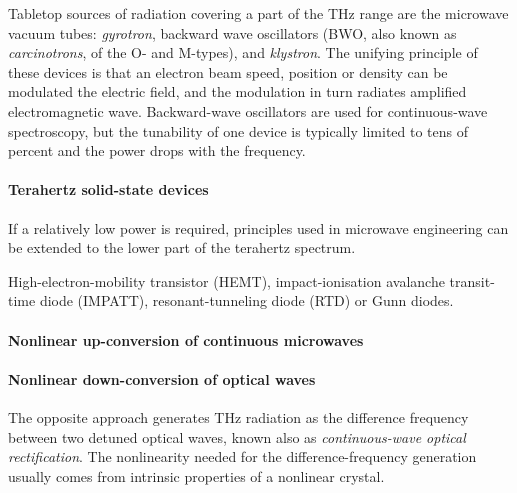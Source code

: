 Tabletop sources of radiation covering a part of the THz range are the microwave vacuum tubes: \textit{gyrotron}, backward wave oscillators (BWO, also known as \textit{carcinotrons}, of the O- and M-types), and \textit{klystron}. The unifying principle of these devices is that an electron beam speed, position or density can be modulated the electric field, and the modulation in turn radiates amplified electromagnetic wave. Backward-wave oscillators are used for continuous-wave spectroscopy, but the tunability of one device is typically limited to tens of percent and the power drops with the frequency.

\paragraph{Terahertz solid-state devices}
If a relatively low power is required, principles used in microwave engineering can be extended to the lower part of the terahertz spectrum. 

High-electron-mobility transistor (HEMT), impact-ionisation avalanche transit-time diode (IMPATT), resonant-tunneling diode (RTD)
\cite{brown1991oscillations}
 or Gunn diodes.



\paragraph{Nonlinear up-conversion of continuous microwaves}

\paragraph{Nonlinear down-conversion of optical waves}
The opposite approach generates THz radiation as the difference frequency between two detuned optical waves, known also as \textit{continuous-wave optical rectification}. The nonlinearity needed for the difference-frequency generation usually comes from intrinsic properties of a nonlinear crystal. 

